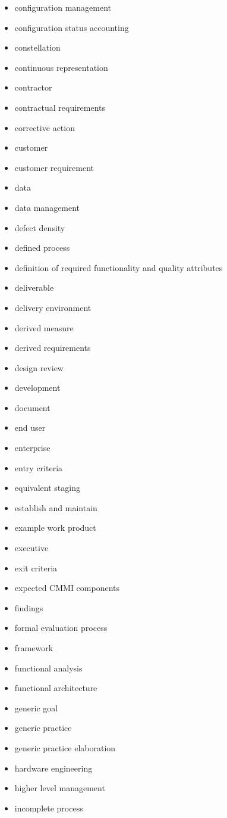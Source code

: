 \begin{itemize}
\item configuration management
\item configuration status accounting
\item constellation
\item continuous representation
\item contractor
\item contractual requirements
\item corrective action
\item customer
\item customer requirement
\item data
\item data management
\item defect density
\item defined process
\item definition of required functionality and quality attributes
\item deliverable
\item delivery environment
\item derived measure
\item derived requirements
\item design review
\item development
\item document
\item end user
\item enterprise
\item entry criteria
\item equivalent staging
\item establish and maintain
\item example work product
\item executive
\item exit criteria
\item expected CMMI components
\item findings
\item formal evaluation process
\item framework
\item functional analysis
\item functional architecture
\item generic goal
\item generic practice
\item generic practice elaboration
\item hardware engineering
\item higher level management
\item incomplete process

\end{itemize}
